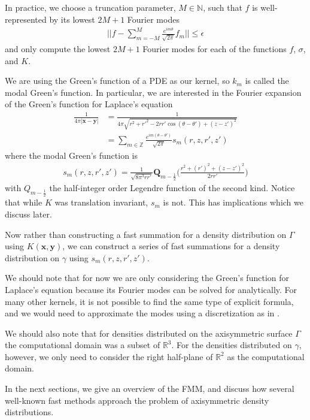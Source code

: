 \documentclass[11pt, oneside]{article}   	%
\begin{document}
In practice, we choose a truncation parameter, $M\in\mathbb{N}$, such that $f$ is well-represented by its lowest $2M+1$ Fourier modes
\begin{align}
||f-\sum\limits_{m=-M}^{M}\frac{e^{im\theta}}{\sqrt{2\pi}}f_m||\le\epsilon
\end{align}
and only compute the lowest $2M+1$ Fourier modes for each of the functions $f$, $\sigma$, and $K$.

We are using the Green's function of a PDE as our kernel, so $k_m$ is called the modal Green's function. In particular, we are interested in the Fourier expansion of the Green's function for Laplace's equation
\begin{align}
\frac{1}{4\pi |\mathbf{x}-\mathbf{y}|} &=\frac{1}{4\pi\sqrt{r^2+r'^2-2rr'\cos{(\theta-\theta')}+(z-z')^2}}\\
&= \sum_{m\in\mathbb{Z}} \frac{e^{im(\theta-\theta')}}{\sqrt{2\pi}} s_m(r,z,r',z')
\end{align}
where the modal Green's function is
\begin{align}
s_m(r,z,r',z')=\frac{1}{\sqrt{8\pi^3 rr'}}\mathbf{Q}_{m-\frac{1}{2}}\bigg(\frac{r^2+(r')^2+(z-z')^2}{2rr'}\bigg)
\end{align}
with $Q_{m-\frac{1}{2}}$ the half-integer order Legendre function of the second kind. Notice that while $K$ was translation invariant, $s_m$ is not. This has implications which we discuss later.

Now rather than constructing a fast summation for a density distribution on $\Gamma$ using $K(\mathbf{x},\mathbf{y})$, we can construct a series of fast summations for a density distribution on $\gamma$ using $s_m(r,z,r',z')$.

We should note that for now we are only considering the Green's function for Laplace's equation because its Fourier modes can be solved for analytically. For many other kernels, it is not possible to find the same type of explicit formula, and we would need to approximate the modes using a discretization as in \cite{YYM}.

We should also note that for densities distributed on the axisymmetric surface $\Gamma$ the computational domain was a subset of $\mathbb{R}^3$. For the densities distributed on $\gamma$, however, we only need to consider the right half-plane of $\mathbb{R}^2$ as the computational domain.

In the next sections, we give an overview of the FMM, and discuss how several well-known fast methods approach the problem of axisymmetric density distributions.
\end{document}
